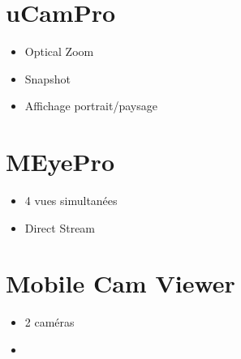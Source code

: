 \documentclass[a4paper,10pt]{report}
\begin{document}
\section{uCamPro}
\begin{itemize}
  \item Optical Zoom
  \item Snapshot
  \item Affichage portrait/paysage
\end{itemize}

\section{MEyePro}
\begin{itemize}
  \item 4 vues simultanées
  \item Direct Stream
\end{itemize}


\section{Mobile Cam Viewer}
\begin{itemize}
  \item 2 caméras
  \item
\end{itemize}
\end{document}
